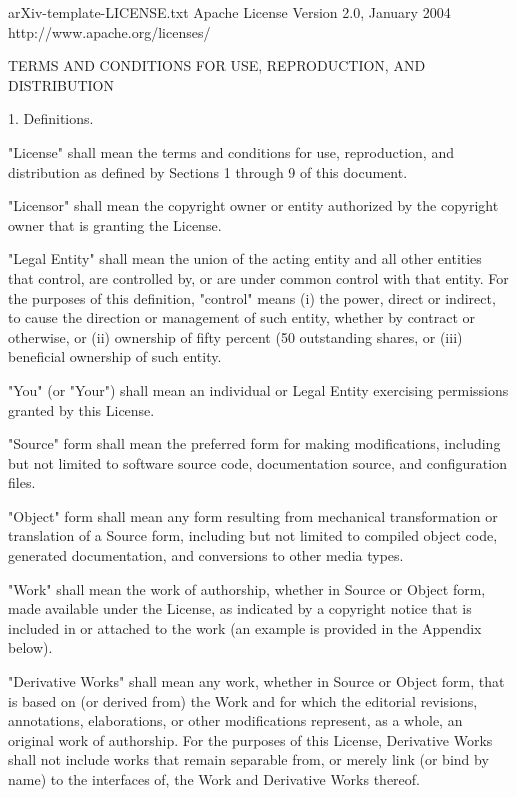 \begin{filecontents*}{arXiv-template-LICENSE.txt}
                                 Apache License
                           Version 2.0, January 2004
                        http://www.apache.org/licenses/

   TERMS AND CONDITIONS FOR USE, REPRODUCTION, AND DISTRIBUTION

   1. Definitions.

      "License" shall mean the terms and conditions for use, reproduction,
      and distribution as defined by Sections 1 through 9 of this document.

      "Licensor" shall mean the copyright owner or entity authorized by
      the copyright owner that is granting the License.

      "Legal Entity" shall mean the union of the acting entity and all
      other entities that control, are controlled by, or are under common
      control with that entity. For the purposes of this definition,
      "control" means (i) the power, direct or indirect, to cause the
      direction or management of such entity, whether by contract or
      otherwise, or (ii) ownership of fifty percent (50%
      outstanding shares, or (iii) beneficial ownership of such entity.

      "You" (or "Your") shall mean an individual or Legal Entity
      exercising permissions granted by this License.

      "Source" form shall mean the preferred form for making modifications,
      including but not limited to software source code, documentation
      source, and configuration files.

      "Object" form shall mean any form resulting from mechanical
      transformation or translation of a Source form, including but
      not limited to compiled object code, generated documentation,
      and conversions to other media types.

      "Work" shall mean the work of authorship, whether in Source or
      Object form, made available under the License, as indicated by a
      copyright notice that is included in or attached to the work
      (an example is provided in the Appendix below).

      "Derivative Works" shall mean any work, whether in Source or Object
      form, that is based on (or derived from) the Work and for which the
      editorial revisions, annotations, elaborations, or other modifications
      represent, as a whole, an original work of authorship. For the purposes
      of this License, Derivative Works shall not include works that remain
      separable from, or merely link (or bind by name) to the interfaces of,
      the Work and Derivative Works thereof.


\end{filecontents*}
